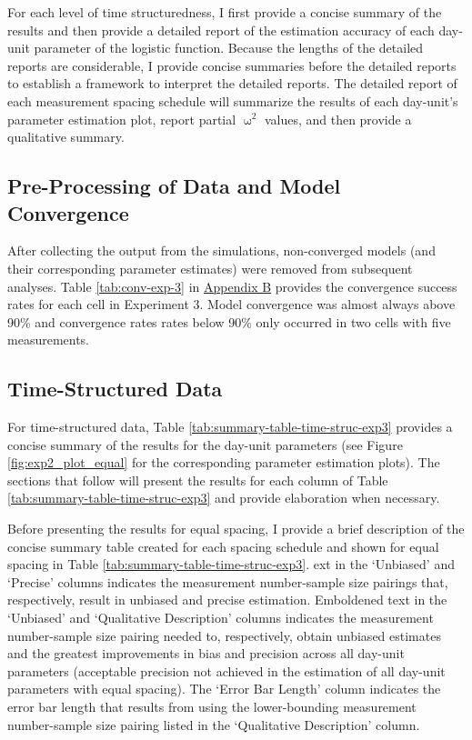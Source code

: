 \documentclass[
12pt, %
twoside,
english]{guelphthesis}
\theoremstyle{definition}
\theoremstyle{definition}
\theoremstyle{definition}
\theoremstyle{definition}
\theoremstyle{remark}
\begin{document}
For each level of time structuredness, I first provide a concise summary of the results and then provide a detailed report of the estimation accuracy of each day-unit parameter of the logistic function. Because the lengths of the detailed reports are considerable, I provide concise summaries before the detailed reports to establish a framework to interpret the detailed reports. The detailed report of each measurement spacing schedule will summarize the results of each day-unit's parameter estimation plot, report partial \(\upomega^2\) values, and then provide a qualitative summary.

\hypertarget{pre-processing-of-data-and-model-convergence-2}{%
\subsection{Pre-Processing of Data and Model Convergence}\label{pre-processing-of-data-and-model-convergence-2}}

After collecting the output from the simulations, non-converged models
(and their corresponding parameter estimates) were removed from
subsequent analyses. Table \ref{tab:conv-exp-3} in \protect\hyperlink{appendix-a-convergence-rates}{Appendix B} provides the convergence
success rates for each cell in Experiment 3. Model convergence was almost always above 90\% and convergence rates
rates below 90\% only occurred in two cells with five measurements.

\hypertarget{concise-example-exp3}{%
\subsection{Time-Structured Data}\label{concise-example-exp3}}

For time-structured data, Table \ref{tab:summary-table-time-struc-exp3} provides a concise summary of the results for the day-unit parameters (see Figure \ref{fig:exp2_plot_equal} for the corresponding parameter estimation plots). The sections that follow will present the results for each column of Table \ref{tab:summary-table-time-struc-exp3} and provide elaboration when necessary.

Before presenting the results for equal spacing, I provide a brief description of the concise summary table created for each spacing schedule and shown for equal spacing in Table \ref{tab:summary-table-time-struc-exp3}. ext in the `Unbiased' and `Precise' columns indicates the measurement number-sample size pairings that, respectively, result in unbiased and precise estimation. Emboldened text in the `Unbiased' and `Qualitative Description' columns indicates the measurement number-sample size pairing needed to, respectively, obtain unbiased estimates and the greatest improvements in bias and precision across all day-unit parameters (acceptable precision not achieved in the estimation of all day-unit parameters with equal spacing). The `Error Bar Length' column indicates the error bar length that results from using the lower-bounding measurement number-sample size pairing listed in the `Qualitative Description' column.
\end{document}

